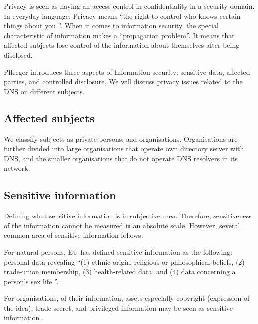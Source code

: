 Privacy is seen as having an access control in confidentiality in a security domain.
In everyday language, Privacy means ``the right to control who knows certain things about you \cite{securityincomputing}''.
When it comes to information security, the special characteristic of information makes a ``propagation problem''.
It means that affected subjects lose control of the information about themselves after being disclosed.

Pfleeger introduces three aspects of Information security: sensitive data, affected parties, and controlled disclosure.
We will discuss privacy issues related to the DNS on different subjects.

\subsection{Affected subjects}
We classify subjects as private persons, and organisations. Organisations are further divided into large organisations that operate own directory server with DNS, and the smaller organisations that do not operate DNS resolvers in its network.

\subsection{Sensitive information}
Defining what sensitive information is in subjective area.
Therefore, sensitiveness of the information cannot be measured in an absolute scale. However, several common area of sensitive information follows.

For natural persons, EU has defined sensitive information as the following: personal data revealing ``(1) ethnic origin, religious or philosophical beliefs, (2) trade-union membership, (3) health-related data, and (4) data concerning a person's sex life \cite{GDPR}''.

For organisations, of their information, assets especially copyright (expression of the idea), trade secret, and privileged information may be seen as sensitive information \cite{securityincomputing}.


